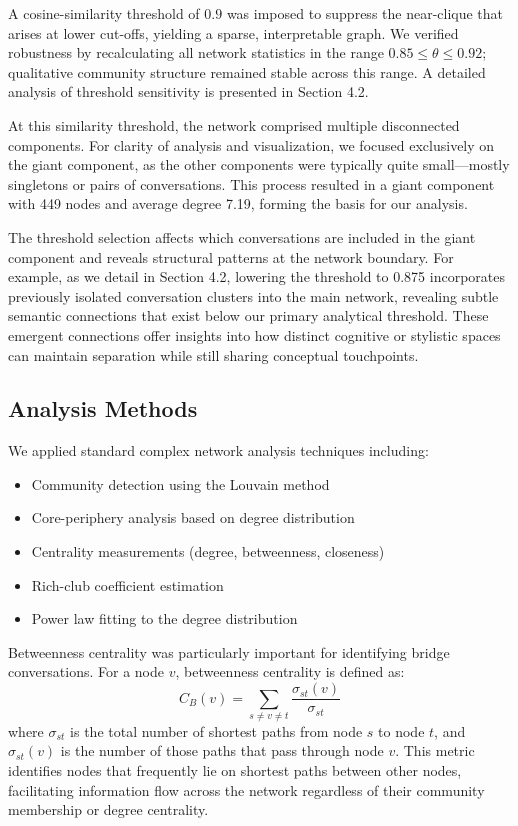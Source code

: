 \documentclass[10pt, a4paper]{article}
\begin{document}
A cosine-similarity threshold of $0.9$ was imposed to suppress the near-clique that arises at lower cut-offs, yielding a sparse, interpretable graph. We verified robustness by recalculating all network statistics in the range $0.85\le\theta\le0.92$; qualitative community structure remained stable across this range. A detailed analysis of threshold sensitivity is presented in Section 4.2.

At this similarity threshold, the network comprised multiple disconnected components. For clarity of analysis and visualization, we focused exclusively on the giant component, as the other components were typically quite small—mostly singletons or pairs of conversations. This process resulted in a giant component with 449 nodes and average degree 7.19, forming the basis for our analysis.

The threshold selection affects which conversations are included in the giant component and reveals structural patterns at the network boundary. For example, as we detail in Section 4.2, lowering the threshold to 0.875 incorporates previously isolated conversation clusters into the main network, revealing subtle semantic connections that exist below our primary analytical threshold. These emergent connections offer insights into how distinct cognitive or stylistic spaces can maintain separation while still sharing conceptual touchpoints.

\subsection{Analysis Methods}

We applied standard complex network analysis techniques including:
\begin{itemize}
    \item Community detection using the Louvain method
    \item Core-periphery analysis based on degree distribution
    \item Centrality measurements (degree, betweenness, closeness)
    \item Rich-club coefficient estimation
    \item Power law fitting to the degree distribution
\end{itemize}

Betweenness centrality was particularly important for identifying bridge conversations. For a node $v$, betweenness centrality is defined as:
\begin{equation}
C_B(v) = \sum_{s \neq v \neq t} \frac{\sigma_{st}(v)}{\sigma_{st}}
\end{equation}
where $\sigma_{st}$ is the total number of shortest paths from node $s$ to node $t$, and $\sigma_{st}(v)$ is the number of those paths that pass through node $v$. This metric identifies nodes that frequently lie on shortest paths between other nodes, facilitating information flow across the network regardless of their community membership or degree centrality.
\end{document}
